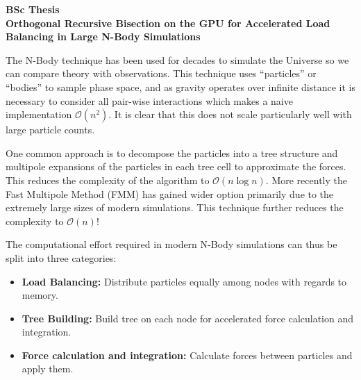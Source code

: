 \documentclass[english]{IFIletter}
\begin{document}
\address{Prof.\ Dr.\ Michael B\"ohlen}
\signature{Prof.\ Dr.\ Michael B\"ohlen\\\position}

\toname{}
\toaddressstreet{}
\toaddresscity{}
\toaddresscountry{}

\begin{letter}

\date{\today}

\opening{\textbf{BSc Thesis \\ Orthogonal Recursive Bisection on the GPU for Accelerated Load Balancing in Large N-Body Simulations }}

\vspace{0.5cm}

The N-Body technique has been used for decades to simulate the Universe so we can compare theory with observations. This technique uses ``particles'' or ``bodies'' to sample phase space, and as gravity operates over infinite distance it is necessary to consider all pair-wise interactions which makes a naive implementation $\mathcal{O}(n^2)$.
It is clear that this does not scale particularly well with large particle counts.

One common approach is to decompose the particles into a tree structure and multipole expansions of the particles in each tree cell to approximate the forces. This reduces the complexity of the algorithm to $\mathcal{O}(n\log{}n)$. More recently the Fast Multipole Method (FMM) has gained wider option primarily due to the extremely large sizes of modern simulations. This technique further reduces the complexity to $\mathcal{O}(n)$!


\begin{comment}
\begin{itemize}
    \item Load balancing and tree building can be derived from the tree decomposition. 
    \item Particle-particle interactions can be reduced from $O(N \times N)$ to $O(N)$ with the fast multi-poles method.
\end{itemize}
\end{comment}

The computational effort required in modern N-Body simulations can thus be split into three categories:

\begin{itemize}
    \item \textbf{Load Balancing:} Distribute particles equally among nodes with regards to memory.
    \item \textbf{Tree Building:} Build tree on each node for accelerated force calculation and integration.
    \item \textbf{Force calculation and integration:} Calculate forces between particles and apply them.
\end{itemize}


\end{letter}
\end{document}
